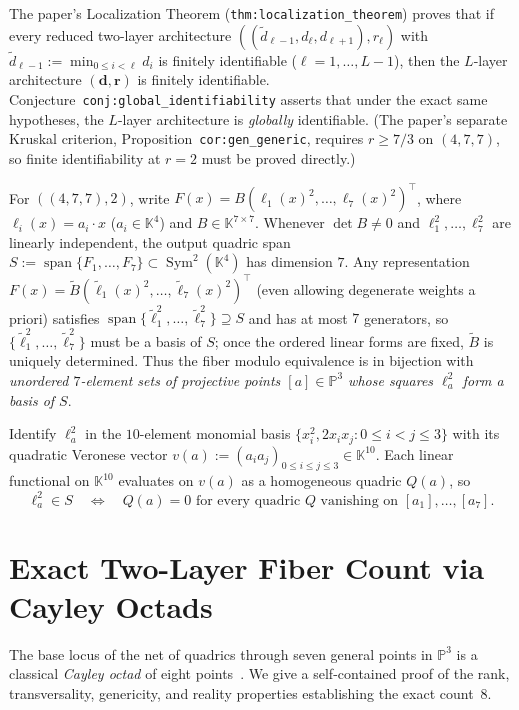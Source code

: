 \documentclass[11pt]{article}
\theoremstyle{plain}
\theoremstyle{definition}
\theoremstyle{remark}
\DeclareMathOperator{\Sym}{Sym}
\DeclareMathOperator{\spn}{span}
\begin{document}
The paper's Localization Theorem (\texttt{thm:localization\_theorem}) proves that if every reduced two-layer architecture $((\tilde{d}_{\ell-1}, d_\ell, d_{\ell+1}), r_\ell)$ with $\tilde{d}_{\ell-1} := \min_{0 \le i < \ell} d_i$ is finitely identifiable ($\ell = 1, \dots, L-1$), then the $L$-layer architecture $(\mathbf{d}, \mathbf{r})$ is finitely identifiable.
Conjecture~\texttt{conj:global\_identifiability} asserts that under the exact same hypotheses, the $L$-layer architecture is \emph{globally} identifiable.
(The paper's separate Kruskal criterion, Proposition~\texttt{cor:gen\_generic}, requires $r \ge 7/3$ on $(4,7,7)$, so finite identifiability at $r = 2$ must be proved directly.)

For $((4, 7, 7), 2)$, write $F(x) = B(\ell_1(x)^2, \dots, \ell_7(x)^2)^\top$, where $\ell_i(x) = a_i \cdot x$ ($a_i \in \mathbb{K}^4$) and $B \in \mathbb{K}^{7 \times 7}$. Whenever $\det B \neq 0$ and $\ell_1^2, \dots, \ell_7^2$ are linearly independent, the output quadric span $S := \spn\{F_1, \dots, F_7\} \subset \Sym^2(\mathbb{K}^4)$ has dimension $7$.
Any representation $F(x) = \tilde{B}(\tilde{\ell}_1(x)^2, \dots, \tilde{\ell}_7(x)^2)^\top$ (even allowing degenerate weights a priori) satisfies $\spn\{\tilde{\ell}_1^2, \dots, \tilde{\ell}_7^2\} \supseteq S$ and has at most $7$ generators, so $\{\tilde{\ell}_1^2, \dots, \tilde{\ell}_7^2\}$ must be a basis of $S$; once the ordered linear forms are fixed, $\tilde{B}$ is uniquely determined.
Thus the fiber modulo equivalence is in bijection with \emph{unordered $7$-element sets of projective points $[a] \in \mathbb{P}^3$ whose squares $\ell_a^2$ form a basis of $S$}.

Identify $\ell_a^2$ in the $10$-element monomial basis $\{x_i^2, 2x_i x_j : 0 \le i < j \le 3\}$ with its quadratic Veronese vector $v(a) := (a_i a_j)_{0 \le i \le j \le 3} \in \mathbb{K}^{10}$. Each linear functional on $\mathbb{K}^{10}$ evaluates on $v(a)$ as a homogeneous quadric $Q(a)$, so
\begin{equation}\label{eq:annihilator}
\ell_a^2 \in S
\quad\Longleftrightarrow\quad
Q(a) = 0 \text{ for every quadric } Q \text{ vanishing on } [a_1], \dots, [a_7].
\end{equation}

\section{Exact Two-Layer Fiber Count via Cayley Octads}

The base locus of the net of quadrics through seven general points in $\mathbb{P}^3$ is a classical \emph{Cayley octad} of eight points~\cite[\S 7]{plaumann2011quartic}. We give a self-contained proof of the rank, transversality, genericity, and reality properties establishing the exact count~$8$.
\end{document}
